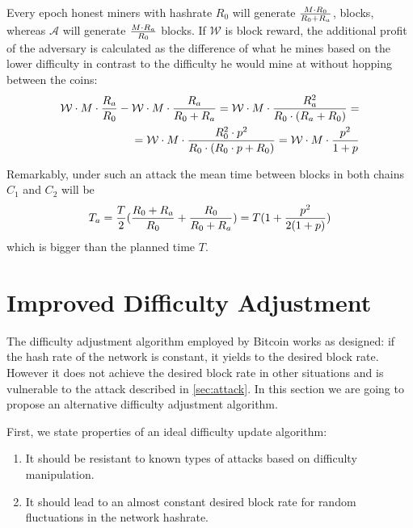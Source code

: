 \documentclass[]{llncs}
\newcommand{\reward}{\mathcal{W}}
\newcommand{\coinA}{$C_1$}
\newcommand{\coinB}{$C_2$}
\begin{document}
Every epoch honest miners with hashrate $R_0$ will generate $M \cdot R_0 \over R_0 + R_a$, blocks, whereas $\mathcal{A}$ will generate $M \cdot R_a \over R_0$ blocks.
If $\reward$ is block reward, the additional profit of the adversary is calculated as the difference of what he mines based on the lower difficulty in contrast to the difficulty he would mine at without hopping between the coins:
\begin{equation}
\begin{aligned}
{\reward \cdot M \cdot { R_a \over R_0} - \reward \cdot M \cdot { R_a \over R_0 + R_a}}  
= {\reward \cdot M \cdot { R_a^2 \over R_0 \cdot (R_a + R_0) }} = \\
= {\reward \cdot M \cdot {R_0^2 \cdot p^2 \over R_0 \cdot (R_0 \cdot p + R_0)}} 
= {\reward \cdot M \cdot { p^2 \over 1+p }}
\end{aligned}
\end{equation}

Remarkably, under such an attack the mean time between blocks in both chains \coinA{} and \coinB{} will be
\begin{equation}
\label{eq:ati}
{T_a={T\over 2}({R_0+R_a\over R_0} + {R_0 \over R_0+R_a}) = T(1 + {p^2\over 2(1+p)})}
\end{equation}
which is bigger than the planned time $T$.


\section{Improved Difficulty Adjustment}
\label{sec:improved}

The difficulty adjustment algorithm employed by Bitcoin works as designed: if the hash rate of the network is constant, it yields to the desired block rate. However it does not achieve the desired block rate in other situations and is vulnerable to the attack described in \ref{sec:attack}.
In this section we are going to propose an alternative difficulty adjustment algorithm.

First, we state properties of an ideal difficulty update algorithm:
\begin{enumerate}
\item{It should be resistant to known types of attacks based on difficulty manipulation.}
\item{It should lead to an almost constant desired block rate for random fluctuations in the network hashrate.}
\end{enumerate}
\end{document}
